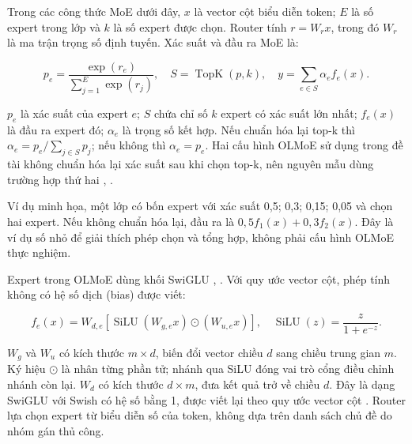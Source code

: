 Trong các công thức MoE dưới đây, $x$ là vector cột biểu diễn token; $E$ là số expert trong lớp và $k$ là số expert được chọn. Router tính $r=W_rx$, trong đó $W_r$ là ma trận trọng số định tuyến. Xác suất và đầu ra MoE là:

\begin{equation}
\label{eq:2.5}
p_e=\frac{\exp(r_e)}{\sum_{j=1}^{E}\exp(r_j)},\quad S=\operatorname{TopK}(p,k),\quad y=\sum_{e\in S}\alpha_e f_e(x).
\end{equation}

$p_e$ là xác suất của expert $e$; $S$ chứa chỉ số $k$ expert có xác suất lớn nhất; $f_e(x)$ là đầu ra expert đó; $\alpha_e$ là trọng số kết hợp. Nếu chuẩn hóa lại top-k thì $\alpha_e=p_e/\sum_{j\in S}p_j$; nếu không thì $\alpha_e=p_e$. Hai cấu hình OLMoE sử dụng trong đề tài không chuẩn hóa lại xác suất sau khi chọn top-k, nên nguyên mẫu dùng trường hợp thứ hai \cite{olmoe_0924_config}, \cite{olmoe_0125_config}.

Ví dụ minh họa, một lớp có bốn expert với xác suất 0,5; 0,3; 0,15; 0,05 và chọn hai expert. Nếu không chuẩn hóa lại, đầu ra là $0,5f_1(x)+0,3f_2(x)$. Đây là ví dụ số nhỏ để giải thích phép chọn và tổng hợp, không phải cấu hình OLMoE thực nghiệm.

Expert trong OLMoE dùng khối SwiGLU \cite{olmoe}, \cite{swiglu}. Với quy ước vector cột, phép tính không có hệ số dịch (bias) được viết:

\begin{equation}
\label{eq:2.6}
f_e(x)=W_{d,e}\left[\operatorname{SiLU}(W_{g,e}x)\odot(W_{u,e}x)\right],\quad \operatorname{SiLU}(z)=\frac{z}{1+e^{-z}}.
\end{equation}

$W_g$ và $W_u$ có kích thước $m\times d$, biến đổi vector chiều $d$ sang chiều trung gian $m$. Ký hiệu $\odot$ là nhân từng phần tử; nhánh qua SiLU đóng vai trò cổng điều chỉnh nhánh còn lại. $W_d$ có kích thước $d\times m$, đưa kết quả trở về chiều $d$. Đây là dạng SwiGLU với Swish có hệ số bằng 1, được viết lại theo quy ước vector cột \cite[mục 2]{swiglu}. Router lựa chọn expert từ biểu diễn số của token, không dựa trên danh sách chủ đề do nhóm gán thủ công.


